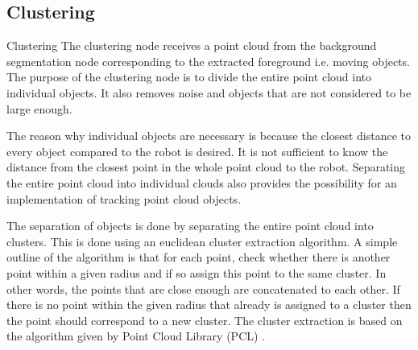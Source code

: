 
\subsection{Clustering}
Clustering
The clustering node receives a point cloud from the background segmentation node corresponding to the extracted foreground i.e. moving objects. The purpose of the clustering node is to divide the entire point cloud into individual objects. It also removes noise and objects that are not considered to be large enough.  

The reason why individual objects are necessary is because the closest distance to every object compared to the robot is desired. It is not sufficient to know the distance from the closest point in the whole point cloud to the robot. Separating the entire point cloud into individual clouds also provides the possibility for an implementation of tracking point cloud objects. 

The separation of objects is done by separating the entire point cloud into clusters. This is done using an euclidean cluster extraction algorithm. A simple outline of the algorithm is that for each point, check whether there is another point within a given radius and if so assign this point to the same cluster. In other words, the points that are close enough are concatenated to each other. If there is no point within the given radius that already is assigned to a cluster then the point should correspond to a new cluster. The cluster extraction is based on the algorithm given by Point Cloud Library (PCL) \cite{CE}.